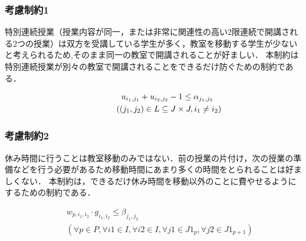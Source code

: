 \documentclass[dvipdfmx,12pt]{beamer}
\begin{document}
\begin{frame}

  \frametitle{\LARGE 考慮制約1}


\vspace{5.0mm}


特別連続授業（授業内容が同一，または非常に関連性の高い2限連続で開講される2つの授業）は双方を受講している学生が多く，教室を移動する学生が少ないと考えられるため,そのまま同一の教室で開講されることが好ましい．
本制約は特別連続授業が別々の教室で開講されることをできるだけ防ぐための制約である．


{\Large
\begin{eqnarray}
&&u_{i_1,j_1}+ u_{i_2,j_2}- 1 \leq \alpha_{j_1,j_2} \quad \\
&&\hspace{10.0mm}\left((j_1,j_2) \in L \subseteq J \times J,i_1 \neq i_2\right)\nonumber
\end{eqnarray}
}
\end{frame}

\begin{frame}

  \frametitle{\LARGE 考慮制約2}


\vspace{5.0mm}


休み時間に行うことは教室移動のみではない．前の授業の片付け，次の授業の準備などを行う必要があるため移動時間にあまり多くの時間をとられることは好ましくない．
本制約は，できるだけ休み時間を移動以外のことに費やせるようにするための制約である．


{\Large
\begin{eqnarray}
&&w_{p,i_1,i_2}\cdot g_{i_1,i_2} \leq \beta_{j_1,j_2}
\label{eqn:seiyaku_first} \\ 
&& \left(\forall p \in P,\forall i1 \in I,\forall i2 \in I,\forall j1 \in J1_p,\forall j2 \in J1_{p+1}\right)\nonumber 
\end{eqnarray}
}
\end{frame}
\end{document}
